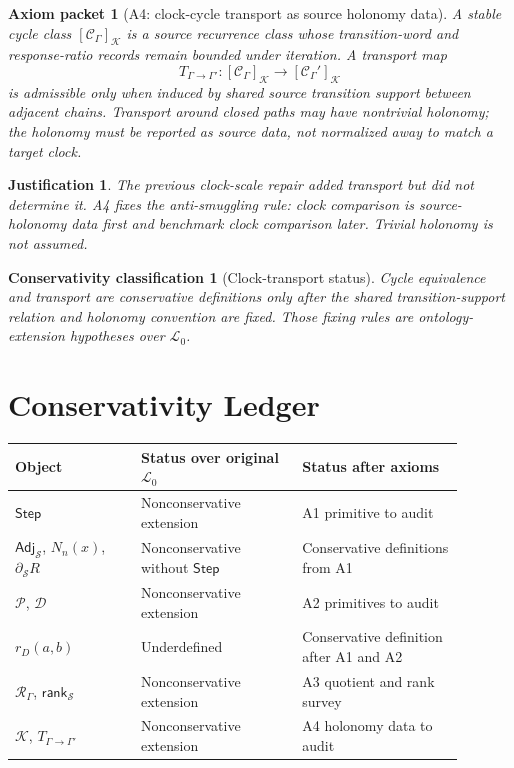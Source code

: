 \documentclass[11pt]{article}
\newcommand{\Step}{\mathsf{Step}}
\newcommand{\Adj}{\mathsf{Adj}_{\mathcal{S}}}
\newcommand{\RespAlg}{\mathcal{R}_{\Gamma}}
\newcommand{\Rank}{\mathsf{rank}_{\mathcal{S}}}
\newcommand{\Cycle}{\mathcal{C}_{\Gamma}}
\newcommand{\Lang}{\mathcal{L}_{0}}
\newtheorem{axiompacket}{Axiom packet}
\newtheorem{justification}{Justification}
\newtheorem{classification}{Conservativity classification}
\begin{document}
\begin{axiompacket}[A4: clock-cycle transport as source holonomy data]
A stable cycle class \([\Cycle]_{\mathcal{K}}\) is a source recurrence class
whose transition-word and response-ratio records remain bounded under
iteration. A transport map
\[
T_{\Gamma\to\Gamma'}:
[\Cycle]_{\mathcal{K}}\to[\Cycle']_{\mathcal{K}}
\]
is admissible only when induced by shared source transition support between
adjacent chains. Transport around closed paths may have nontrivial holonomy;
the holonomy must be reported as source data, not normalized away to match a
target clock.
\end{axiompacket}

\begin{justification}
The previous clock-scale repair added transport but did not determine it.
A4 fixes the anti-smuggling rule: clock comparison is source-holonomy data
first and benchmark clock comparison later. Trivial holonomy is not assumed.
\end{justification}

\begin{classification}[Clock-transport status]
Cycle equivalence and transport are conservative definitions only after the
shared transition-support relation and holonomy convention are fixed. Those
fixing rules are ontology-extension hypotheses over \(\Lang\).
\end{classification}

\section{Conservativity Ledger}

\begin{center}
\begin{tabular}{p{0.25\linewidth}p{0.32\linewidth}p{0.32\linewidth}}
\textbf{Object} & \textbf{Status over original \(\Lang\)} & \textbf{Status after axioms} \\
\hline
\(\Step\) & Nonconservative extension & A1 primitive to audit \\
\(\Adj\), \(N_n(x)\), \(\partial_{\mathcal{S}}R\) & Nonconservative without \(\Step\) & Conservative definitions from A1 \\
\(\mathcal{P}\), \(\mathcal{D}\) & Nonconservative extension & A2 primitives to audit \\
\(r_D(a,b)\) & Underdefined & Conservative definition after A1 and A2 \\
\(\RespAlg\), \(\Rank\) & Nonconservative extension & A3 quotient and rank survey \\
\(\mathcal{K}\), \(T_{\Gamma\to\Gamma'}\) & Nonconservative extension & A4 holonomy data to audit \\
\end{tabular}
\end{center}
\end{document}

